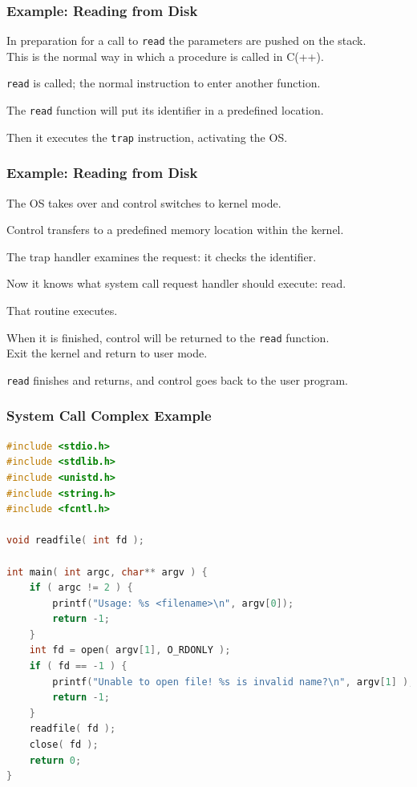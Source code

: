 \begin{frame}
\frametitle{Example: Reading from Disk}

In preparation for a call to \texttt{read} the parameters are pushed on the stack.\\
\quad This is the normal way in which a procedure is called in C(++). 

\texttt{read} is called; the normal instruction to enter another function.

The \texttt{read} function will put its identifier in a predefined location.

Then it executes the \texttt{trap} instruction, activating the OS.

\end{frame}

\begin{frame}
\frametitle{Example: Reading from Disk}


The OS takes over and control switches to kernel mode. 

Control transfers to a predefined memory location within the kernel. 

The trap handler examines the request: it checks the identifier. 

Now it knows what system call request handler should execute: read. 

That routine executes. 

When it is finished, control will be returned to the \texttt{read} function.\\
\quad Exit the kernel and return to user mode.

\texttt{read} finishes and returns, and control goes back to the user program.


\end{frame}


\begin{frame}[fragile]
\frametitle{System Call Complex Example}

\begin{lstlisting}[language=C]
#include <stdio.h>
#include <stdlib.h>
#include <unistd.h>
#include <string.h>
#include <fcntl.h>

void readfile( int fd );

int main( int argc, char** argv ) {
    if ( argc != 2 ) {
        printf("Usage: %s <filename>\n", argv[0]);
        return -1;
    }
    int fd = open( argv[1], O_RDONLY );
    if ( fd == -1 ) {
        printf("Unable to open file! %s is invalid name?\n", argv[1] );
        return -1;
    }
    readfile( fd );
    close( fd );
    return 0;
}
\end{lstlisting}
\end{frame}

